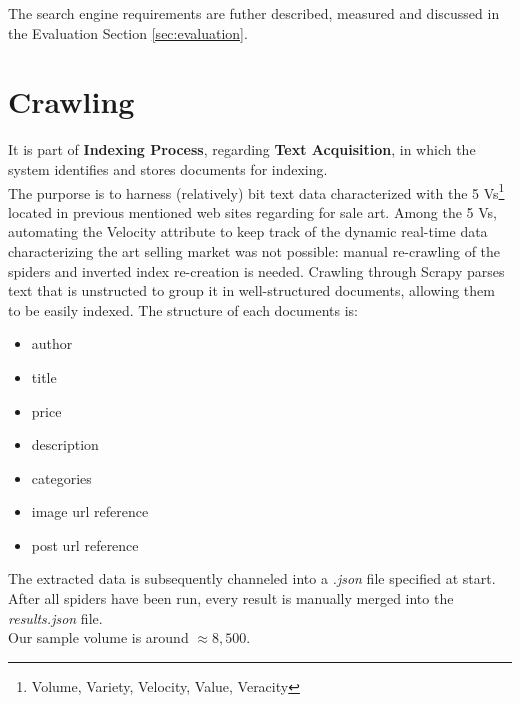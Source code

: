 \documentclass[12pt]{spieman}  %
\begin{document}
\begin{spacing}{1}
    The search engine requirements are futher described, measured and discussed
    in the Evaluation Section \ref{sec:evaluation}.

    \section{Crawling}\label{sec:crawling}
    It is part of \textbf{Indexing Process}, regarding \textbf{Text Acquisition}, in which the system
    identifies and stores documents for indexing.\\
    The purporse is to harness (relatively) bit text data characterized with the 5
    Vs\footnote{Volume, Variety, Velocity, Value, Veracity}
    located in previous mentioned web sites regarding for sale art.
    Among the 5 Vs, automating the Velocity attribute to keep track of the dynamic real-time data characterizing
    the art selling market was not possible:
    manual re-crawling of the spiders and inverted index re-creation is needed.
    Crawling through Scrapy parses text that is unstructed to group it in well-structured documents,
    allowing them to be easily indexed.
    The structure of each documents is:
    \vspace{-0.2cm}
    \begin{itemize}
        \setlength\itemsep{0.1em}
        \item author
        \item title
        \item price
        \item description
        \item categories
        \item image url reference
        \item post url reference
    \end{itemize}

    The extracted data is subsequently channeled into a \textit{.json} file specified at start.
    After all spiders have been run, every result is manually merged into the \textit{results.json} file.\\
    Our sample volume is around $\approx 8,500$.


\end{spacing}
\end{document}
